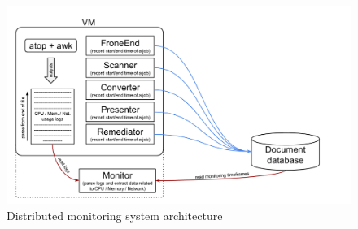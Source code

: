 \begin{figure}
\centering
\includegraphics[width=\linewidth]{./img/MonitoringCPUMechanismExtended.png}
\caption{Distributed monitoring system architecture}
\label{fig:monitoringArchitectureExtended}
\end{figure}
